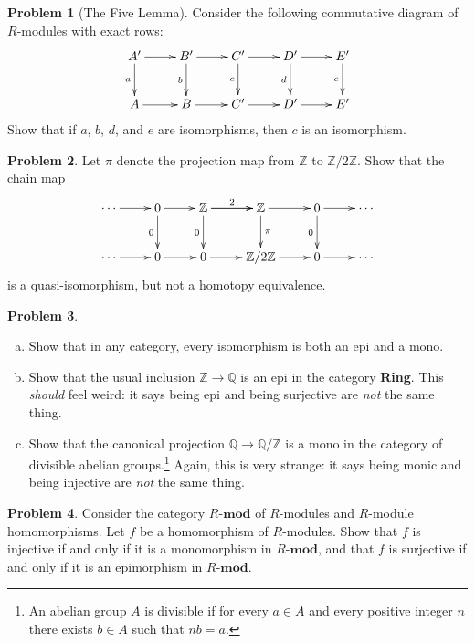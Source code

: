 \documentclass[11pt]{article}
\newcommand{\ZZ}{\mathbb{Z}}
\theoremstyle{definition}
\newtheorem{problem}{Problem}
\begin{document}
\begin{problem}[The Five Lemma]
	Consider the following commutative diagram of $R$-modules with exact rows:
	$$\xymatrix{A' \ar[d]_-a \ar[r] & B' \ar[r] \ar[d]_-b & C' \ar[r] \ar[d]_-c & D' \ar[d]_-d \ar[r] & E' \ar[d]_-e \\
	A \ar[r] & B \ar[r] & C' \ar[r] & D' \ar[r] & E'}$$
	Show that if $a$, $b$, $d$, and $e$ are isomorphisms, then $c$ is an isomorphism.
\end{problem}


\begin{problem}
	Let $\pi$ denote the projection map from $\ZZ$ to $\ZZ/2\ZZ$. Show that the chain map
	$$\xymatrix{\cdots \ar[r] & 0 \ar[r] \ar[d]_-0 & \ZZ \ar[r]^-2 \ar[d]_-0 \ar[r] & \ZZ \ar[d]^-{\pi} \ar[r] & 0 \ar[d]_-0 \ar[r] & \cdots \\ 
	\cdots \ar[r] & 0 \ar[r] & 0 \ar[r] & \ZZ/2\ZZ \ar[r] & 0 \ar[r] & \cdots}$$
	is a quasi-isomorphism, but not a homotopy equivalence.
\end{problem}


\newpage

\begin{problem}$\,$
		\begin{enumerate}[a)]
		\item Show that in any category, every isomorphism is both an epi and a mono.
		\item Show that the usual inclusion $\mathbb{Z} \longrightarrow \mathbb{Q}$ is an epi in the category {\bf Ring}. This \emph{should} feel weird: it says being epi and being surjective are \emph{not} the same thing.
		\item Show that the canonical projection $\mathbb{Q} \longrightarrow \mathbb{Q}/\ZZ$ is a mono in the category of divisible abelian groups.\footnote{An abelian group $A$ is divisible if for every $a \in A$ and every positive integer $n$ there exists $b \in A$ such that $nb = a$.} Again, this is very strange: it says being monic and being injective are \emph{not} the same thing. 
		\end{enumerate}
\end{problem}


\begin{problem}
	Consider the category $R\textbf{-mod}$ of $R$-modules and $R$-module homomorphisms. Let $f$ be a homomorphism of $R$-modules. Show that $f$ is injective if and only if it is a monomorphism in $R\textbf{-mod}$, and that $f$ is surjective if and only if it is an epimorphism in $R\textbf{-mod}$.
\end{problem}
\end{document}
